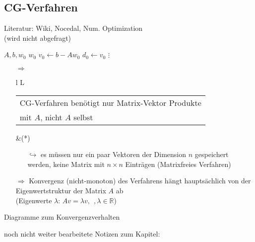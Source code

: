 \subsection{CG-Verfahren}
\label{subsec:CG_method}
Literatur: Wiki, Nocedal, Num. Optimization\\
(wird nicht abgefragt)
\begin{algorithmic}
	\State $A,b,w_0$
	\State $w_0$
	\State $v_0 \gets b-Aw_0$
	\State $d_0 \gets v_0$
		\State $\vdots$
	\EndFor
\end{algorithmic}
\begin{itemize}
	\item[$\Rightarrow$] \begin{tabular}{l L}\begin{tabular}{l}
		CG-Verfahren benötigt nur Matrix-Vektor Produkte\\
		mit $A$, nicht $A$ selbst
		\end{tabular}&(*)\\
		\end{tabular}
	\begin{itemize}
		\item[$\hookrightarrow$] es müssen nur ein paar Vektoren der Dimension $n$ gespeichert werden, keine Matrix mit $n\times n$ Einträgen (Matrixfreies Verfahren)
	\end{itemize}
	\item[$\Rightarrow$] Konvergenz (nicht-monoton) des Verfahrens hängt hauptsächlich von der Eigenwertstruktur der Matrix $A$ ab \\
	(Eigenwerte $\lambda$: $Av = \lambda v,\ \ , \lambda \in \mathbb{R}$)
\end{itemize}

Diagramme zum Konvergenzverhalten\\
\vspace{3cm}



\noindent\makebox[\linewidth]{\rule{\paperwidth}{0.4pt}}
noch nicht weiter bearbeitete Notizen zum Kapitel:\\

